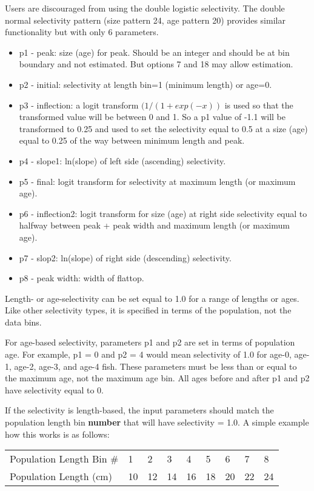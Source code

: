 Users are discouraged from using the double logistic selectivity. The double normal selectivity pattern (size pattern 24, age pattern 20) provides similar functionality but with only 6 parameters.
	\begin{itemize}
		\item p1 - peak: size (age) for peak. Should be an integer and should be at bin boundary and not estimated. But options 7 and 18 may allow estimation.
		\item p2 - initial: selectivity at length bin=1 (minimum length) or age=0.
		\item p3 - inflection: a logit transform $(1/(1+exp(-x))$ is used so that the transformed value will be between 0 and 1. So a p1 value of -1.1 will be transformed to 0.25 and used to set the selectivity equal to 0.5 at a size (age) equal to 0.25 of the way between minimum length and peak. 
		\item p4 - slope1: ln(slope) of left side (ascending) selectivity.
		\item p5 - final: logit transform for selectivity at maximum length (or maximum age).
		\item p6 - inflection2: logit transform for size (age) at right side selectivity equal to halfway between peak + peak width and maximum length (or maximum age).
		\item p7 - slop2: ln(slope) of right side (descending) selectivity.
		\item p8 - peak width: width of flattop.
	\end{itemize}
	
Length- or age-selectivity can be set equal to 1.0 for a range of lengths or ages. Like other selectivity types, it is specified in terms of the population, not the data bins.

For age-based selectivity, parameters p1 and p2 are set in terms of population age. For example, p1 = 0 and p2 = 4 would mean selectivity of 1.0 for age-0, age-1, age-2, age-3, and age-4 fish. These parameters must be less than or equal to the maximum age, not the maximum age bin. All ages before and after p1 and p2 have selectivity equal to 0.

If the selectivity is length-based, the input parameters should match the population length bin \textbf{number} that will have selectivity = 1.0. A simple example how this works is as follows:

\begin{longtable}{p{4cm} p{0.9cm} p{0.9cm} p{0.9cm} p{0.9cm} p{0.9cm} p{0.9cm} p{0.9cm} p{0.9cm}}
	\hline	
	Population Length Bin \# \Tstrut & 1 & 2 & 3 & 4 & 5 & 6 & 7 & 8 \\
	Population Length (cm)      & 10 & 12 & 14 & 16 & 18 & 20 & 22 & 24 \Bstrut\\
	\hline
\end{longtable} 

